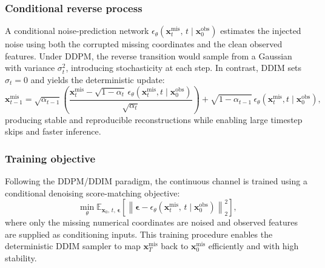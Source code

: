 \documentclass[times, review, 10pt]{elsarticle}
\begin{document}
\subsubsection{Conditional reverse process}
A conditional noise-prediction network
$
\epsilon_\theta(\mathbf{x}_t^{\mathrm{mis}},\, t \mid \mathbf{x}_0^{\mathrm{obs}})
$
estimates the injected noise using both the corrupted missing coordinates and
the clean observed features. Under DDPM, the reverse transition would sample
from a Gaussian with variance $\sigma_t^2$, introducing stochasticity at each
step. In contrast, DDIM sets $\sigma_t=0$ and yields the deterministic update:
\begin{equation}
\mathbf{x}_{t-1}^{\mathrm{mis}}
=
\sqrt{\alpha_{t-1}}
\!\left(
\frac{\mathbf{x}_t^{\mathrm{mis}}
      - \sqrt{1-\alpha_t}\,
        \epsilon_\theta(\mathbf{x}_t^{\mathrm{mis}},t \mid \mathbf{x}_0^{\mathrm{obs}})}
     {\sqrt{\alpha_t}}
\right)
+
\sqrt{1-\alpha_{t-1}}\,
\epsilon_\theta(\mathbf{x}_t^{\mathrm{mis}},t\mid\mathbf{x}_0^{\mathrm{obs}}),
\end{equation}
producing stable and reproducible reconstructions while enabling large
timestep skips and faster inference.

\subsubsection{Training objective}
Following the DDPM/DDIM paradigm, the continuous channel is trained using a
conditional denoising score-matching objective:
\begin{equation}
\min_\theta
\mathbb{E}_{\mathbf{x}_0,\, t,\, \boldsymbol{\epsilon}}
\left[
\left\|
\boldsymbol{\epsilon}
-
\epsilon_\theta(\mathbf{x}_t^{\mathrm{mis}},\, t \mid \mathbf{x}_0^{\mathrm{obs}})
\right\|_2^2
\right],
\end{equation}
where only the missing numerical coordinates are noised and observed features
are supplied as conditioning inputs. This training procedure enables the
deterministic DDIM sampler to map $\mathbf{x}_T^{\mathrm{mis}}$ back to
$\mathbf{x}_0^{\mathrm{mis}}$ efficiently and with high stability.

\end{document}
